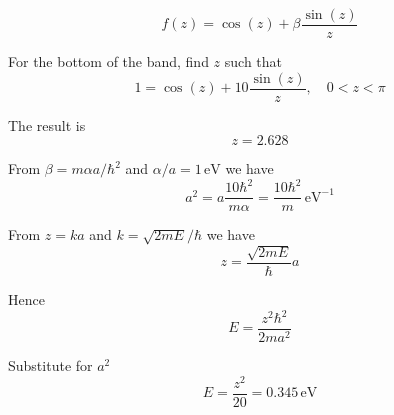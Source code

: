 


\bigskip
\begin{equation*}
f(z)=\cos(z)+\beta\frac{\sin(z)}{z}
\tag{5.73}
\end{equation*}

For the bottom of the band, find $z$ such that
\begin{equation*}
1=\cos(z)+10\frac{\sin(z)}{z},\quad0<z<\pi
\end{equation*}

The result is
\begin{equation*}
z=2.628
\end{equation*}

From $\beta=m\alpha a/\hbar^2$ and $\alpha/a=1\,\text{eV}$ we have
\begin{equation*}
a^2=a\frac{10\hbar^2}{m\alpha}=\frac{10\hbar^2}{m}\,\text{eV}^{-1}
\end{equation*}

From $z=ka$ and $k=\sqrt{2mE}/\hbar$ we have
\begin{equation*}
z=\frac{\sqrt{2mE}}{\hbar}a
\end{equation*}

Hence
\begin{equation*}
E=\frac{z^2\hbar^2}{2ma^2}
\end{equation*}

Substitute for $a^2$
\begin{equation*}
E=\frac{z^2}{20}=0.345\,\text{eV}
\end{equation*}


